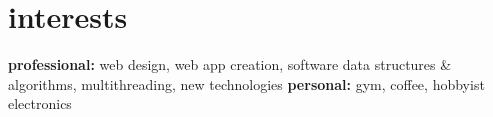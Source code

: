 \documentclass[]{friggeri-cv} %
\begin{document}



\section{interests}

\textbf{professional:} web design, web app creation, software data structures \& algorithms, multithreading, new technologies \textbf{personal:} gym, coffee, hobbyist electronics
\end{document}
